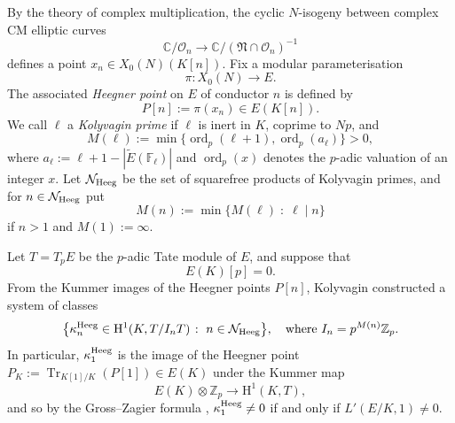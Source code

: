 \documentclass[10pt,reqno]{amsart}
\numberwithin{equation}{section}
\theoremstyle{plain}
\theoremstyle{definition}
\theoremstyle{definition}
\theoremstyle{plain}
\theoremstyle{plain}
\theoremstyle{plain}
\theoremstyle{plain}
\theoremstyle{plain}
\theoremstyle{plain}
\DeclareMathOperator{\ord}{ord}
\newcommand{\Z}{\mathbb{Z}}
\newcommand{\rH}{\mathrm{H}}
\begin{document}
By the theory of complex multiplication, the cyclic $N$-isogeny between complex CM elliptic curves
\[
\mathbb{C}/\mathcal{O}_n\rightarrow\mathbb{C}/(\mathfrak{N}\cap\mathcal{O}_n)^{-1}
\]
defines a point $x_n\in X_0(N)(K[n])$. Fix a modular parameterisation 
\begin{equation}\label{par}
\pi:X_0(N)\rightarrow E.
\end{equation}
The associated \emph{Heegner point} on $E$ of conductor $n$ is defined by   
\begin{equation}\label{eq:heegnerpoint}
P[n]:=\pi(x_n)\in E(K[n]).
\end{equation}
We call $\ell$ a \emph{Kolyvagin prime} if $\ell$ is inert in $K$, coprime to $Np$, and 
$$
M(\ell):=\min \{\ord_p(\ell+1), \ord_p(a_\ell)\}>0,
$$
 where $a_\ell:=\ell+1-|\tilde{E}(\mathbb{F}_\ell)|$ and $\ord_p(x)$ denotes the $p$-adic valuation of an integer $x$. Let $\mathcal{N}_{\rm Heeg}$ be the set of squarefree products of Kolyvagin primes, and for $n\in \mathcal{N}_{\rm Heeg}$ put 
$$
 M(n):=\min \{M(\ell)\;\colon\;\ell\mid n\}
$$
if $n>1$ and $M(1):=\infty$. 

Let $T=T_pE$ be the $p$-adic Tate module of $E$, and suppose that
\begin{equation}\label{eq:intro-tor}
E(K)[p]=0.\tag{tor}
\end{equation}
From the Kummer images of the Heegner points $P[n]$, Kolyvagin constructed a system of classes 
\[
\bigl\{\kappa_{n}^{\rm Heeg}\in \rH^1(K,T/I_nT)\;\colon\;n\in \mathcal{N}_{\rm Heeg}\bigr\},\quad\textrm{where $I_n=p^{M(n)}\Z_p$.}
\] 
In particular, $\kappa_{1}^{\rm Heeg}$ is the image of the Heegner point $P_K:=\operatorname{Tr}_{K[1]/K}(P[1])\in E(K)$ under the Kummer map
\[
E(K)\otimes\Z_p\rightarrow\rH^1(K,T), 
\] 
and so by the Gross--Zagier formula \cite{grosszagier}, $\kappa_1^{\rm Heeg}\neq 0$ if and only if $L'(E/K,1)\neq 0$. 
\end{document}
